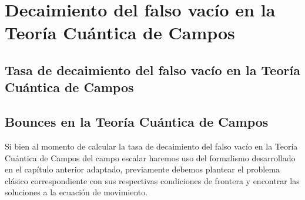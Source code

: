 \chapter[Decaimiento del falso vacío en la TCC]{Decaimiento del falso vacío en la Teoría Cuántica de Campos}


\section{Tasa de decaimiento del falso vacío en la Teoría Cuántica de Campos}

\section{Bounces en la Teoría Cuántica de Campos}

Si bien al momento de calcular la tasa de decaimiento del falso vacío en la Teoría Cuántica de Campos del campo escalar haremos uso del formalismo desarrollado en el capítulo anterior adaptado, %
previamente debemos plantear el problema clásico correspondiente con sus respectivas condiciones de frontera y encontrar las soluciones a la ecuación de movimiento.  

